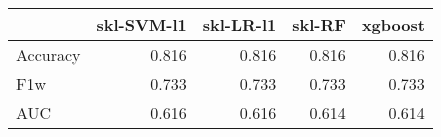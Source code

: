 \begin{tabular}{lrrrr}
\toprule
{} &  skl-SVM-l1 &  skl-LR-l1 &  skl-RF &  xgboost \\
\midrule
Accuracy &       0.816 &      0.816 &   0.816 &    0.816 \\
F1w      &       0.733 &      0.733 &   0.733 &    0.733 \\
AUC      &       0.616 &      0.616 &   0.614 &    0.614 \\
\bottomrule
\end{tabular}
